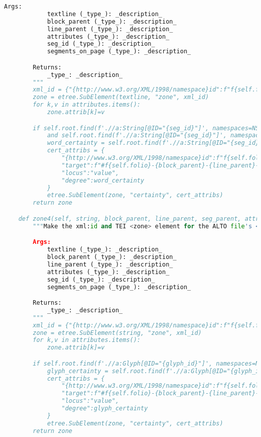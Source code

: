 \documentclass[class=article, crop=false]{standalone}
\begin{document}
\begin{lstlisting}[language=python, style=python]
        Args:
            textline (_type_): _description_
            block_parent (_type_): _description_
            line_parent (_type_): _description_
            attributes (_type_): _description_
            seg_id (_type_): _description_
            segments_on_page (_type_): _description_

        Returns:
            _type_: _description_
        """        
        xml_id = {"{http://www.w3.org/XML/1998/namespace}id":f"f{self.folio}-{block_parent}-{line_parent}-{seg_id}-segCount{strings_on_page}"}
        zone = etree.SubElement(textline, "zone", xml_id)
        for k,v in attributes.items():
            zone.attrib[k]=v

        if self.root.find(f'.//a:String[@ID="{seg_id}"]', namespaces=NS) is not None \
            and self.root.find(f'.//a:String[@ID="{seg_id}"]', namespaces=NS).get("WC") is not None:
            word_certainty = self.root.find(f'.//a:String[@ID="{seg_id}"]', namespaces=NS).get("WC")
            cert_attribs = {
                "{http://www.w3.org/XML/1998/namespace}id":f"f{self.folio}-{block_parent}-{line_parent}-{seg_id}-segCount{strings_on_page}-cert",
                "target":f"#f{self.folio}-{block_parent}-{line_parent}-{seg_id}-segCount{strings_on_page}-text",
                "locus":"value",
                "degree":word_certainty
            }
            etree.SubElement(zone, "certainty", cert_attribs)
        return zone

    def zone4(self, string, block_parent, line_parent, seg_parent, attributes, glyph_id, glyphs_on_page):
        """Make the xml:id and TEI <zone> element for the ALTO file's <String> (segment/word).

        Args:
            textline (_type_): _description_
            block_parent (_type_): _description_
            line_parent (_type_): _description_
            attributes (_type_): _description_
            seg_id (_type_): _description_
            segments_on_page (_type_): _description_

        Returns:
            _type_: _description_
        """        
        xml_id = {"{http://www.w3.org/XML/1998/namespace}id":f"f{self.folio}-{block_parent}-{line_parent}-{seg_parent}-{glyph_id}-glyphCount{glyphs_on_page}"}
        zone = etree.SubElement(string, "zone", xml_id)
        for k,v in attributes.items():
            zone.attrib[k]=v

        if self.root.find(f'.//a:Glyph[@ID="{glyph_id}"]', namespaces=NS).get("GC") is not None:
            glyph_certainty = self.root.find(f'.//a:Glyph[@ID="{glyph_id}"]', namespaces=NS).get("GC")
            cert_attribs = {
                "{http://www.w3.org/XML/1998/namespace}id":f"f{self.folio}-{block_parent}-{line_parent}-{seg_parent}-{glyph_id}-glyphCount{glyphs_on_page}-cert",
                "target":f"#f{self.folio}-{block_parent}-{line_parent}-{seg_parent}-{glyph_id}-glyphCount{glyphs_on_page}-text",
                "locus":"value",
                "degree":glyph_certainty
            }
            etree.SubElement(zone, "certainty", cert_attribs)
        return zone


\end{lstlisting}
\end{document}
